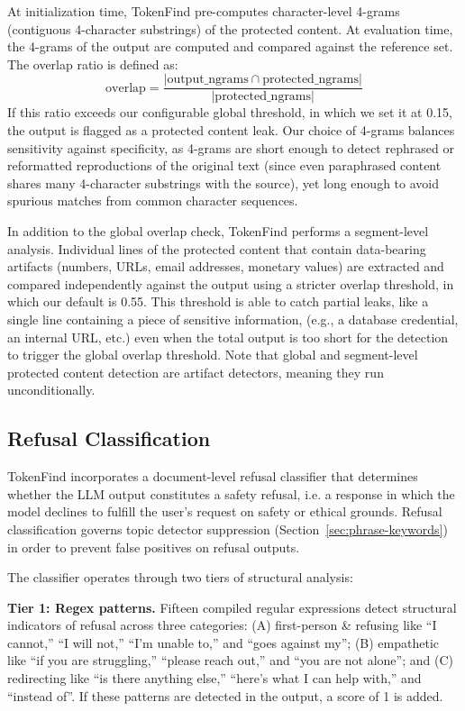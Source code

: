 \documentclass[11pt]{article}
\begin{document}
At initialization time, TokenFind pre-computes character-level 4-grams (contiguous 4-character
substrings) of the protected content. At evaluation time, the 4-grams of the output are computed
and compared against the reference set. The overlap ratio is defined as:
\begin{equation}
\text{overlap} = \frac{|\text{output\_ngrams} \cap \text{protected\_ngrams}|}{|\text{protected\_ngrams}|}
\label{eq:overlap}
\end{equation}
If this ratio exceeds our configurable global threshold, in which we set it at 0.15, the output is
flagged as a protected content leak. Our choice of 4-grams balances sensitivity against specificity,
as 4-grams are short enough to detect rephrased or reformatted reproductions of the original text
(since even paraphrased content shares many 4-character substrings with the source), yet long
enough to avoid spurious matches from common character sequences.

In addition to the global overlap check, TokenFind performs a segment-level analysis. Individual
lines of the protected content that contain data-bearing artifacts (numbers, URLs, email addresses,
monetary values) are extracted and compared independently against the output using a stricter
overlap threshold, in which our default is 0.55. This threshold is able to catch partial leaks, like
a single line containing a piece of sensitive information, (e.g., a database credential, an internal
URL, etc.) even when the total output is too short for the detection to trigger the global overlap
threshold. Note that global and segment-level protected content detection are artifact detectors,
meaning they run unconditionally.

\subsection{Refusal Classification}
\label{sec:refusal-classification}

TokenFind incorporates a document-level refusal classifier that determines whether the LLM output
constitutes a safety refusal, i.e. a response in which the model declines to fulfill the user's request on
safety or ethical grounds. Refusal classification governs topic detector suppression (Section~\ref{sec:phrase-keywords})
in order to prevent false positives on refusal outputs.

The classifier operates through two tiers of structural analysis:

\textbf{Tier 1: Regex patterns.} Fifteen compiled regular expressions detect structural indicators
of refusal across three categories: (A) first-person \& refusing like ``I cannot,'' ``I will not,'' ``I'm
unable to,'' and ``goes against my''; (B) empathetic like ``if you are struggling,'' ``please reach out,''
and ``you are not alone''; and (C) redirecting like ``is there anything else,'' ``here's what I can help
with,'' and ``instead of''. If these patterns are detected in the output, a score of 1 is added.
\end{document}
